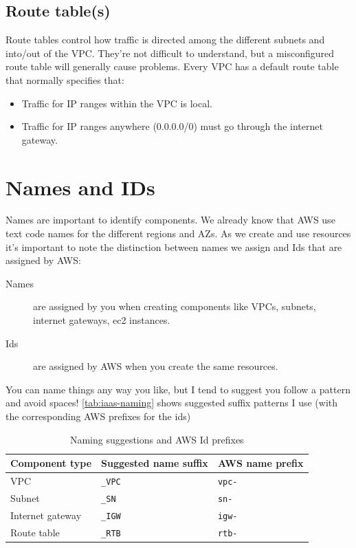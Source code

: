 \subsection{Route table(s)}

Route tables control how traffic is directed among the different subnets and into/out of the VPC.
They're not difficult to understand, but a misconfigured route table will generally cause problems.
Every VPC has a default route table that normally specifies that:
\begin{itemize}
\item Traffic for IP ranges within the VPC is local.
\item Traffic for IP ranges anywhere (0.0.0.0/0) must go through the internet gateway.
\end{itemize}


\section{Names and IDs}\label{names-and-ids}

Names are important to identify components.
We already know that AWS use text code names for the different regions and AZs.
As we create and use resources it's important to note the distinction between names we assign and Ids that are assigned by AWS:

\begin{description}
\item[Names]
  are assigned by you when creating components like VPCs, subnets, internet gateways, ec2 instances.
\item[Ids]
  are assigned by AWS when you create the same resources.
\end{description}

You can name things any way you like, but I tend to suggest you follow a pattern and avoid spaces!
\autoref{tab:iaas-naming} shows suggested suffix patterns I use (with the corresponding AWS prefixes for the ids)

\begin{table}[htbp]
  \centering
  \begin{tabular}{l l l}
    \toprule
    \textbf{Component type} & \textbf{Suggested name suffix} & \textbf{AWS name prefix}\\
    \midrule
    VPC & \texttt{\_VPC} & \texttt{vpc-}\\
    Subnet & \texttt{\_SN} & \texttt{sn-}\\
    Internet gateway & \texttt{\_IGW} & \texttt{igw-}\\
    Route table & \texttt{\_RTB} & \texttt{rtb-}\\
    \bottomrule
  \end{tabular}
  \caption{Naming suggestions and AWS Id prefixes}
  \label{tab:iaas-naming}
\end{table}

